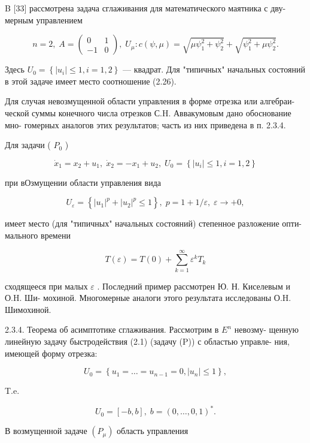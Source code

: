 \documentclass[10pt]{article}
\begin{document}
B [33] рассмотрена задача сглаживания для математического маятника с дву- мерным управлением

\[
n = 2,\;A = \left( \begin{array}{cc} 0 & 1 \\   - 1 & 0 \end{array}\right) ,\;{U}_{\mu } : c\left( {\psi ,\mu }\right)  = \sqrt{\mu {\psi }_{1}^{2} + {\psi }_{2}^{2}} + \sqrt{{\psi }_{1}^{2} + \mu {\psi }_{2}^{2}}.
\]

Здесь \({U}_{0} = \left\{  {\left| {u}_{i}\right|  \leq  1,i = 1,2}\right\}\) — квадрат. Для "типичных" начальных состояний в этой задаче имеет место соотношение (2.26).

Для случая невозмущенной области управления в форме отрезка или алгебраи- ческой суммы конечного числа отрезков С.H. Аввакумовым дано обоснование мно- гомерных аналогов этих результатов; часть из них приведена в п. 2.3.4.

Для задачи ( \({P}_{0}\) )

\[
{\dot{x}}_{1} = {x}_{2} + {u}_{1},\;{\dot{x}}_{2} =  - {x}_{1} + {u}_{2},\;{U}_{0} = \left\{  {\left| {u}_{i}\right|  \leq  1,i = 1,2}\right\}
\]

при вОзмущении области управления вида

\[
{U}_{\varepsilon } = \left\{  {{\left| {u}_{1}\right| }^{p} + {\left| {u}_{2}\right| }^{p} \leq  1}\right\}  ,\;p = 1 + 1/\varepsilon ,\;\varepsilon  \rightarrow   + 0,
\]

имеет место (для "типичных" начальных состояний) степенное разложение опти- мального времени

\[
T\left( \varepsilon \right)  = T\left( 0\right)  + \mathop{\sum }\limits_{{k = 1}}^{\infty }{\varepsilon }^{k}{T}_{k}
\]

сходящееся при малых \(\varepsilon\) . Последний пример рассмотрен Ю. Н. Киселевым и О.H. Ши- мохиной. Многомерные аналоги этого результата исследованы О.H. Шимохиной.

2.3.4. Теорема об асимптотике сглаживания. Рассмотрим в \({E}^{n}\) невозму- щенную линейную задачу быстродействия (2.1) (задачу (P)) с областью управле- ния, имеющей форму отрезка:

\[
{U}_{0} = \left\{  {{u}_{1} = \ldots  = {u}_{n - 1} = 0,\left| {u}_{n}\right|  \leq  1}\right\}  ,
\]

T.e.

\[
{U}_{0} = \left[  {-b,b}\right]  ,\;b = {\left( 0,\ldots ,0,1\right) }^{ * }.
\]

В возмущенной задаче \(\left( {P}_{\mu }\right)\) область управления
\end{document}
